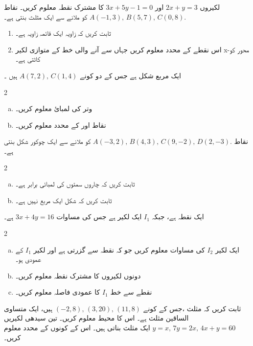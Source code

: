 لکیروں \( 2x+y = 3 \)  اور  \( 3x+5y -1 =0 \) کا مشترک نقطہ معلوم کریں۔
نقاط \( A(-1,3), \, B(5,7), \, C(0,8). \) کو ملانے سے ایک مثلث بنتی ہے۔
\begin{enumerate}
\item
ثابت کریں کہ زاویہ  ایک قائمہ زاویہ ہے۔ 
\item
اس نقطے کے محدد معلوم کریں جہاں سے آنے والی  خط    کے متوازی لکیر x-محور کو کاٹتی ہے۔
\end{enumerate}
ایک مربع شکل ہے جس کے دو کونے \( A(7,2), \, C(1,4) \)  ہیں ۔
\begin{multicols}{2}
\begin{enumerate}[a.]
\item
وتر  کی لمبائ معلوم کریں۔
\item
نقاط  اور کے محدد معلوم کریں۔
\end{enumerate}
\end{multicols}
نقاط \( A(-3,2), \, B(4,3), \, C(9,-2), \, D(2,-3). \) کو ملانے سے ایک چوکور شکل بنتی ہے۔
\begin{multicols}{2}
\begin{enumerate}[a.]
\item
ثابت کریں کہ چاروں سمتوں کی لمبائی برابر ہے۔
\item
ثابت کریں کہ شکل   ایک مربع نہیں ہے۔
\end{enumerate}
\end{multicols}
 ایک نقطہ ہے، جبکہ  \( I_{1} \) ایک لکیر ہے جس کی مساوات \( 3x+4y=16 \) ہے۔
\begin{multicols}{2}
\begin{enumerate}[a.]
\item
ایک لکیر     \( I_{2} \)  کی مساوات معلوم کریں جو کہ نقطہ  سے گزرتی ہے اور لکیر  \( I_{1} \) کے عمودی ہو۔
\item
دونوں لکیروں کا مشترک نقطہ معلوم کریں۔
\item
نقطے  سے خط \( I_{1} \) کا عمودی فاصلہ معلوم کریں۔
\end{enumerate}
\end{multicols}
ثابت کریں کہ مثلث ،جس کے کونے \( (-2,8), \, (3,20), \, (11,8) \) ہیں، ایک متساوی الساقین مثلث ہے۔ اس کا محیط معلوم کریں۔
تین سیدھی لکیریں \( y=x, \, 7y=2x, \, 4x+y =60 \) ایک مثلث بناتی ہیں۔ اس کے کونوں کے محدد معلوم کریں۔ 

